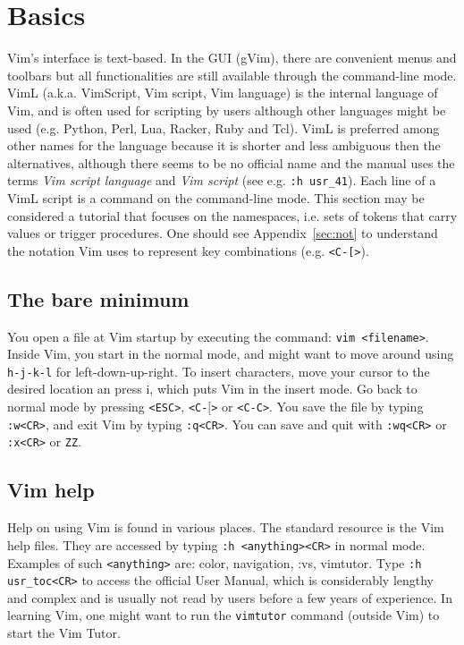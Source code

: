 \documentclass{article}
\newcommand{\ttt}[1] {
	\texttt{<#1>}}
\newcommand{\tttt}[1]{\texttt{#1}}
\begin{document}
\section{Basics}\label{basics}
Vim's interface is text-based.
In the GUI (gVim),
there are convenient menus and toolbars
but all functionalities are still available through
the command-line mode.
VimL (a.k.a. VimScript, Vim script, Vim language)
is the internal language of Vim,
and is often used for scripting by users
although other languages might be used 
(e.g. Python, Perl, Lua, Racker, Ruby and Tcl). 
VimL is preferred among other names for the language
because it is shorter and less ambiguous then the alternatives,
although there seems to be no official name and the manual
uses the terms \emph{Vim script language} and \emph{Vim script}
(see e.g. \tttt{:h usr\_41}).
Each line of a VimL script is a command on the
command-line mode.
This section may be considered a tutorial
that focuses on the namespaces, i.e. sets of tokens
that carry values or trigger procedures.
One should see Appendix~\ref{sec:not}
to understand the notation Vim uses to represent key combinations
(e.g. \ttt{C-[}).

\subsection{The bare minimum}\label{minimum}
You open a file at Vim startup by executing
the command: \texttt{vim <filename>}.
Inside Vim, you start in the normal
mode, and might want to move around using
\texttt{h-j-k-l} for left-down-up-right.
To insert characters, move your
cursor to the desired location an press i,
which puts Vim in the insert mode.
Go back to normal mode by pressing
\texttt{<ESC>}, \ttt{C-$[$} or \texttt{<C-C>}.
You save the file by typing \texttt{:w<CR>},
and exit Vim by typing \texttt{:q<CR>}.
You can save and quit with \tttt{:wq<CR>}
or \tttt{:x<CR>} or \tttt{ZZ}.

\subsection{Vim help}
Help on using Vim is found in various places.
The standard resource is the Vim help files.
They are accessed by typing \texttt{:h <anything><CR>}
in normal mode.
Examples of such \texttt{<anything>} are:
color, navigation, :vs, vimtutor.
Type 
\texttt{:h usr\_toc<CR>}
to access the official User Manual,
which is considerably lengthy and complex
and is usually not read by users before a few years
of experience.
In learning Vim, one
might want to run the \texttt{vimtutor} command
(outside Vim) to start the Vim Tutor.
\end{document}
